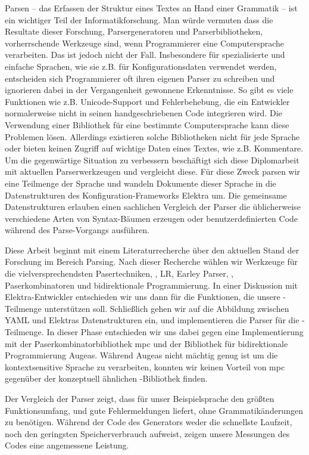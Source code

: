 \begin{kurzfassung}
Parsen – das Erfassen der Struktur eines Textes an Hand einer Grammatik – ist ein wichtiger Teil der Informatikforschung. Man würde vermuten dass die Resultate dieser Forschung, Parsergeneratoren und Parserbibliotheken, vorherrschende Werkzeuge sind, wenn Programmierer eine Computersprache verarbeiten. Das ist jedoch nicht der Fall. Insbesondere für spezialisierte und einfache Sprachen, wie sie z.B. für Konfigurationsdaten verwendet werden, entscheiden sich Programmierer oft ihren eigenen Parser zu schreiben und ignorieren dabei in der Vergangenheit gewonnene Erkenntnisse. So gibt es viele Funktionen wie z.B. Unicode-Support und Fehlerbehebung, die ein Entwickler normalerweise nicht in seinen handgeschriebenen Code integrieren wird. Die Verwendung einer Bibliothek für eine bestimmte Computersprache kann diese Problemen lösen. Allerdings existieren solche Bibliotheken nicht für jede Sprache oder bieten keinen Zugriff auf wichtige Daten eines Textes, wie z.B. Kommentare. Um die gegenwärtige Situation zu verbessern beschäftigt sich diese Diplomarbeit mit aktuellen Parserwerkzeugen und vergleicht diese. Für diese Zweck parsen wir eine Teilmenge der Sprache  und wandeln Dokumente dieser Sprache in die Datenstrukturen des Konfiguration-Frameworks Elektra um. Die gemeinsame Datenstrukturen erlauben einen sachlichen Vergleich der Parser die üblicherweise verschiedene Arten von Syntax-Bäumen erzeugen oder benutzerdefinierten Code während des Parse-Vorgangs ausführen.

Diese Arbeit beginnt mit einem Literaturrecherche über den aktuellen Stand der Forschung im Bereich Parsing. Nach dieser Recherche wählen wir Werkzeuge für die vielversprechendsten Pasertechniken, , LR, Earley Parser, , Paserkombinatoren und bidirektionale Programmierung. In einer Diskussion mit Elektra-Entwickler entschieden wir uns dann für die Funktionen, die unsere -Teilmenge unterstützen soll. Schließlich gehen wir auf die Abbildung zwischen YAML und Elektras Datenstrukturen ein, und implementieren die Parser für die -Teilmenge. In dieser Phase entschieden wir uns dabei gegen eine Implementierung mit der Paserkombinatorbibliothek mpc und der Bibliothek für bidirektionale Programmierung Augeas. Während Augeas nicht mächtig genug ist um die kontextsensitive Sprache  zu verarbeiten, konnten wir keinen Vorteil von mpc gegenüber der konzeptuell ähnlichen -Bibliothek  finden.

Der Vergleich der Parser zeigt, dass für unser Beispielsprache  den größten Funktionsumfang, und gute Fehlermeldungen liefert, ohne Grammatikänderungen zu benötigen. Während der Code des Generators weder die schnellste Laufzeit, noch den geringsten Speicherverbrauch aufweist, zeigen unsere Messungen des Codes eine angemessene Leistung.
\end{kurzfassung}
